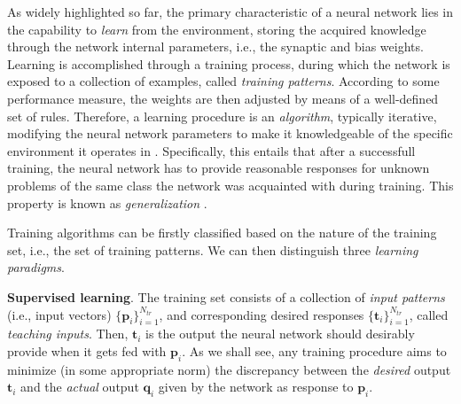 \documentclass[12pt, a4paper, twoside, openright]{report}
\numberwithin{equation}{chapter}
\theoremstyle{theorem}
\theoremstyle{definition}
\theoremstyle{remark}
\theoremstyle{proposition}
\numberwithin{figure}{chapter}
\begin{document}
		As widely highlighted so far, the primary characteristic of a neural network lies in the capability to \emph{learn} from the environment, storing the acquired knowledge through the network internal parameters, i.e., the synaptic and bias weights. Learning is accomplished through a training process, during which the network is exposed to a collection of examples, called \emph{training patterns}. According to some performance measure, the weights are then adjusted by means of a well-defined set of rules. Therefore, a learning procedure is an \emph{algorithm}, typically iterative, modifying the neural network parameters to make it knowledgeable of the specific environment it operates in \cite{Hay05}. Specifically, this entails that after a successfull training, the neural network has to provide reasonable responses for unknown problems of the same class the network was acquainted with during training. This property is known as \emph{generalization} \cite{Kri}. 
		
		Training algorithms can be firstly classified based on the nature of the training set, i.e., the set of training patterns. We can then distinguish three \emph{learning paradigms}.
		
		\vspace*{0.3cm}
		
		\noindent \textbf{Supervised learning}. The training set consists of a collection of \emph{input patterns} (i.e., input vectors) $\big\lbrace \boldsymbol{p}_i \big\rbrace_{i = 1}^{N_{tr}}$, and corresponding desired responses $\big\lbrace \boldsymbol{t}_i \big\rbrace_{i = 1}^{N_{tr}}$, called \emph{teaching inputs}. Then, $\boldsymbol{t}_i$ is the output the neural network should desirably provide when it gets fed with $\boldsymbol{p}_i$. As we shall see, any training procedure aims to minimize (in some appropriate norm) the discrepancy between the \emph{desired} output $\boldsymbol{t}_i$ and the \emph{actual} output $\boldsymbol{q}_i$ given by the network as response to $\boldsymbol{p}_i$. 
		
		\vspace*{0.3cm}
		
\end{document}
